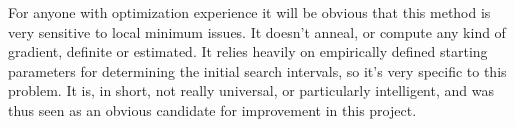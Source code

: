 For anyone with optimization experience it will be obvious that this method is very sensitive to local minimum issues. It doesn't anneal, or compute any kind of gradient, definite or estimated. It relies heavily on empirically defined starting parameters for determining the initial search intervals, so it's very specific to this problem. It is, in short, not really universal, or particularly intelligent, and was thus seen as an obvious candidate for improvement in this project.